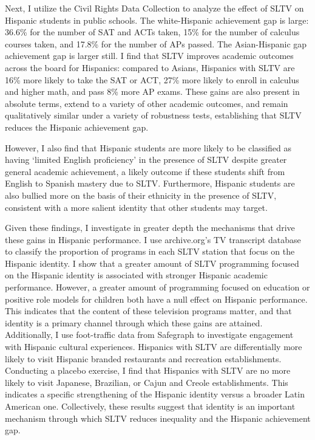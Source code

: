 \documentclass[11pt]{article}
\begin{document}
Next, I utilize the Civil Rights Data Collection to analyze the effect of SLTV on Hispanic students in public schools. The white-Hispanic achievement gap is large: 36.6\% for the number of SAT and ACTs taken, 15\% for the number of calculus courses taken, and 17.8\% for the number of APs passed. The Asian-Hispanic gap achievement gap is larger still. I find that SLTV improves academic outcomes across the board for Hispanics: compared to Asians, Hispanics with SLTV are 16\% more likely to take the SAT or ACT, 27\% more likely to enroll in calculus and higher math, and pass 8\% more AP exams. These gains are also present in absolute terms, extend to a variety of other academic outcomes, and remain qualitatively similar under a variety of robustness tests, establishing that SLTV reduces the Hispanic achievement gap. 

However, I also find that Hispanic students are more likely to be classified as having ‘limited English proficiency’ in the presence of SLTV despite greater general academic achievement, a likely outcome if these students shift from English to Spanish mastery due to SLTV. Furthermore, Hispanic students are also bullied more on the basis of their ethnicity in the presence of SLTV, consistent with a more salient identity that other students may target.

Given these findings, I investigate in greater depth the mechanisms that drive these gains in Hispanic performance. I use archive.org’s TV transcript database to classify the proportion of programs in each SLTV station that focus on the Hispanic identity. I show that a greater amount of SLTV programming focused on the Hispanic identity is associated with stronger Hispanic academic performance. However, a greater amount of programming focused on education or positive role models for children both have a null effect on Hispanic performance. This indicates that the content of these television programs matter, and that identity is a primary channel through which these gains are attained. Additionally, I use foot-traffic data from Safegraph to investigate engagement with Hispanic cultural experiences. Hispanics with SLTV are differentially more likely to visit Hispanic branded restaurants and recreation establishments. Conducting a placebo exercise, I find that Hispanics with SLTV are no more likely to visit Japanese, Brazilian, or Cajun and Creole establishments. This indicates a specific strengthening of the Hispanic identity versus a broader Latin American one. Collectively, these results suggest that identity is an important mechanism through which SLTV reduces inequality and the Hispanic achievement gap. 
\end{document}
